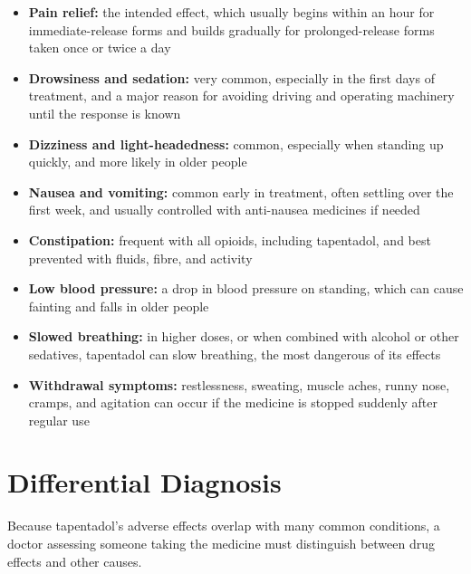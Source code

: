 \begin{itemize}
    \item \textbf{Pain relief:} the intended effect, which usually begins within an hour for immediate-release forms and builds gradually for prolonged-release forms taken once or twice a day
    \item \textbf{Drowsiness and sedation:} very common, especially in the first days of treatment, and a major reason for avoiding driving and operating machinery until the response is known
    \item \textbf{Dizziness and light-headedness:} common, especially when standing up quickly, and more likely in older people
    \item \textbf{Nausea and vomiting:} common early in treatment, often settling over the first week, and usually controlled with anti-nausea medicines if needed
    \item \textbf{Constipation:} frequent with all opioids, including tapentadol, and best prevented with fluids, fibre, and activity
    \item \textbf{Low blood pressure:} a drop in blood pressure on standing, which can cause fainting and falls in older people
    \item \textbf{Slowed breathing:} in higher doses, or when combined with alcohol or other sedatives, tapentadol can slow breathing, the most dangerous of its effects
    \item \textbf{Withdrawal symptoms:} restlessness, sweating, muscle aches, runny nose, cramps, and agitation can occur if the medicine is stopped suddenly after regular use
\end{itemize}

\section*{Differential Diagnosis}
Because tapentadol's adverse effects overlap with many common conditions, a doctor assessing someone taking the medicine must distinguish between drug effects and other causes.

